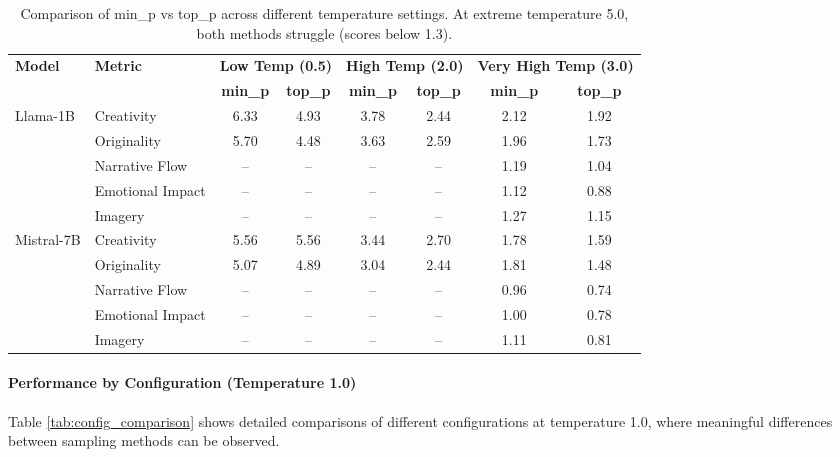 \documentclass{article}
\begin{document}
\begin{table}[htbp]
\centering
\small
\begin{tabular}{l|l|cc|cc|cc}
\hline
\multirow{2}{*}{\textbf{Model}} & \multirow{2}{*}{\textbf{Metric}} & 
\multicolumn{2}{c|}{\textbf{Low Temp (0.5)}} & 
\multicolumn{2}{c|}{\textbf{High Temp (2.0)}} & 
\multicolumn{2}{c}{\textbf{Very High Temp (3.0)}} \\
\cline{3-8}
& & \textbf{min\_p} & \textbf{top\_p} & \textbf{min\_p} & \textbf{top\_p} & \textbf{min\_p} & \textbf{top\_p} \\
\hline
\multirow{5}{*}{Llama-1B} 
& Creativity & 6.33 & 4.93 & 3.78 & 2.44 & 2.12 & 1.92 \\
& Originality & 5.70 & 4.48 & 3.63 & 2.59 & 1.96 & 1.73 \\
& Narrative Flow & -- & -- & -- & -- & 1.19 & 1.04 \\
& Emotional Impact & -- & -- & -- & -- & 1.12 & 0.88 \\
& Imagery & -- & -- & -- & -- & 1.27 & 1.15 \\
\hline
\multirow{5}{*}{Mistral-7B} 
& Creativity & 5.56 & 5.56 & 3.44 & 2.70 & 1.78 & 1.59 \\
& Originality & 5.07 & 4.89 & 3.04 & 2.44 & 1.81 & 1.48 \\
& Narrative Flow & -- & -- & -- & -- & 0.96 & 0.74 \\
& Emotional Impact & -- & -- & -- & -- & 1.00 & 0.78 \\
& Imagery & -- & -- & -- & -- & 1.11 & 0.81 \\
\hline
\end{tabular}
\caption{Comparison of min\_p vs top\_p across different temperature settings. At extreme temperature 5.0, both methods struggle (scores below 1.3).}
\label{tab:temp_comparison}
\end{table}

\paragraph{Performance by Configuration (Temperature 1.0)}
Table \ref{tab:config_comparison} shows detailed comparisons of different configurations at temperature 1.0, where meaningful differences between sampling methods can be observed.
\end{document}
